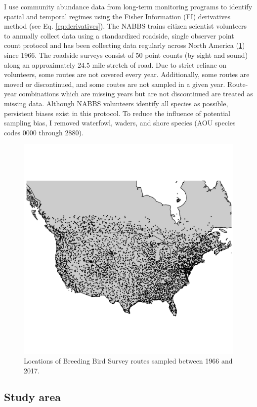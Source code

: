\documentclass[12pt,twoside,openany]{reedthesis}
\begin{document}
I use community abundance data from long-term monitoring programs to
identify spatial and temporal regimes using the Fisher Information (FI)
derivatives method (see Eq. \eqref{eq:derivatives}). The NABBS trains
citizen scientist volunteers to annually collect data using a
standardized roadside, single observer point count protocol and has been
collecting data regularly across North America (\ref{fig:bbsPoints})
since 1966. The roadside surveys consist of 50 point counts (by sight
and sound) along an approximately 24.5 mile stretch of road. Due to
strict reliane on volunteers, some routes are not covered every year.
Additionally, some routes are moved or discontinued, and some routes are
not sampled in a given year. Route-year combinations which are missing
years but are not discontinued are treated as missing data. Although
NABBS volunteers identify all species as possible, persistent biases
exist in this protocol. To reduce the influence of potential sampling
bias, I removed waterfowl, waders, and shore species (AOU species codes
0000 through 2880).
\begin{figure}
\includegraphics[width=29.17in]{./chapterFiles/fisherSpatial/figures/figsCalledInDiss/bbsRoutesUsed} \caption{Locations of Breeding Bird Survey routes sampled between 1966 and 2017.}\label{fig:bbsPoints}
\end{figure}
\subsection{Study area}\label{study-area}
\end{document}
